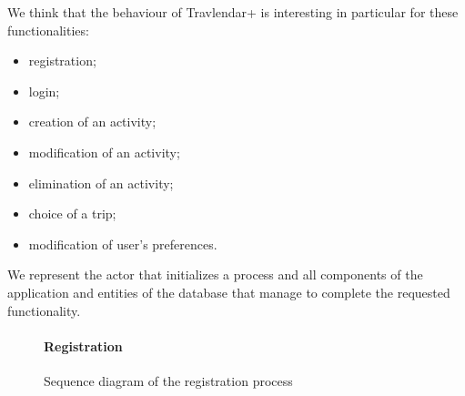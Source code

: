 \documentclass[12pt,titlepage]{article}
\begin{document}
We think that the behaviour of Travlendar+ is interesting in particular for these functionalities:
\begin{itemize}
\item registration;
\item login;
\item creation of an activity;
\item modification of an activity;
\item elimination of an activity;
\item choice of a trip;
\item modification of user's preferences.
\end{itemize}

We represent the actor that initializes a process and all components of the application and entities of the database that manage to complete the requested functionality.

\begin{figure}
\paragraph{Registration}
\centering
{}
\caption{Sequence diagram of the registration process}
\end{figure}
\end{document}
